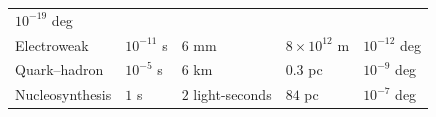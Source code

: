 \documentclass[
  11pt,
]{article}
\begin{document}
\begin{longtable}[]{@{}lllll@{}}
\begin{minipage}[t]{0.17\columnwidth}
\(10^{-19}\) deg\strut
\end{minipage}\tabularnewline
\begin{minipage}[t]{0.17\columnwidth}\raggedright
Electroweak\strut
\end{minipage} & \begin{minipage}[t]{0.17\columnwidth}\raggedright
\(10^{-11}\) s\strut
\end{minipage} & \begin{minipage}[t]{0.17\columnwidth}\raggedright
\(6\) mm\strut
\end{minipage} & \begin{minipage}[t]{0.17\columnwidth}\raggedright
\(8\times10^{12}\) m\strut
\end{minipage} & \begin{minipage}[t]{0.17\columnwidth}\raggedright
\(10^{-12}\) deg\strut
\end{minipage}\tabularnewline
\begin{minipage}[t]{0.17\columnwidth}\raggedright
Quark--hadron\strut
\end{minipage} & \begin{minipage}[t]{0.17\columnwidth}\raggedright
\(10^{-5}\) s\strut
\end{minipage} & \begin{minipage}[t]{0.17\columnwidth}\raggedright
\(6\) km\strut
\end{minipage} & \begin{minipage}[t]{0.17\columnwidth}\raggedright
\(0.3\) pc\strut
\end{minipage} & \begin{minipage}[t]{0.17\columnwidth}\raggedright
\(10^{-9}\) deg\strut
\end{minipage}\tabularnewline
\begin{minipage}[t]{0.17\columnwidth}\raggedright
Nucleosynthesis\strut
\end{minipage} & \begin{minipage}[t]{0.17\columnwidth}\raggedright
\(1\) s\strut
\end{minipage} & \begin{minipage}[t]{0.17\columnwidth}\raggedright
\(2\) light-seconds\strut
\end{minipage} & \begin{minipage}[t]{0.17\columnwidth}\raggedright
\(84\) pc\strut
\end{minipage} & \begin{minipage}[t]{0.17\columnwidth}\raggedright
\(10^{-7}\) deg\strut
\end{minipage}\tabularnewline

\end{longtable}
\end{document}
